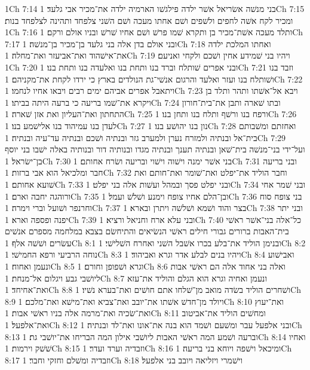 1Ch 7:14  בני מנשׁה אשׂריאל אשׁר ילדה פילגשׁו הארמיה ילדה את־מכיר אבי גלעד׃
1Ch 7:15  ומכיר לקח אשׁה לחפים ולשׁפים ושׁם אחתו מעכה ושׁם השׁני צלפחד ותהינה לצלפחד בנות׃
1Ch 7:16  ותלד מעכה אשׁת־מכיר בן ותקרא שׁמו פרשׁ ושׁם אחיו שׁרשׁ ובניו אולם ורקם׃
1Ch 7:17  ובני אולם בדן אלה בני גלעד בן־מכיר בן־מנשׁה׃
1Ch 7:18  ואחתו המלכת ילדה את־אישׁהוד ואת־אביעזר ואת־מחלה׃
1Ch 7:19  ויהיו בני שׁמידע אחין ושׁכם ולקחי ואניעם׃
1Ch 7:20  ובני אפרים שׁותלח וברד בנו ותחת בנו ואלעדה בנו ותחת בנו׃
1Ch 7:21  וזבד בנו ושׁותלח בנו ועזר ואלעד והרגום אנשׁי־גת הנולדים בארץ כי ירדו לקחת את־מקניהם׃
1Ch 7:22  ויתאבל אפרים אביהם ימים רבים ויבאו אחיו לנחמו׃
1Ch 7:23  ויבא אל־אשׁתו ותהר ותלד בן ויקרא את־שׁמו בריעה כי ברעה היתה בביתו׃
1Ch 7:24  ובתו שׁארה ותבן את־בית־חורון התחתון ואת־העליון ואת אזן שׁארה׃
1Ch 7:25  ורפח בנו ורשׁף ותלח בנו ותחן בנו׃
1Ch 7:26  לעדן בנו עמיהוד בנו אלישׁמע בנו׃
1Ch 7:27  נון בנו יהושׁע בנו׃
1Ch 7:28  ואחזתם ומשׁבותם בית־אל ובנתיה ולמזרח נערן ולמערב גזר ובנתיה ושׁכם ובנתיה עד־עיה ובנתיה׃
1Ch 7:29  ועל־ידי בני־מנשׁה בית־שׁאן ובנתיה תענך ובנתיה מגדו ובנותיה דור ובנותיה באלה ישׁבו בני יוסף בן־ישׂראל׃
1Ch 7:30  בני אשׁר ימנה וישׁוה וישׁוי ובריעה ושׂרח אחותם׃
1Ch 7:31  ובני בריעה חבר ומלכיאל הוא אבי ברזות׃
1Ch 7:32  וחבר הוליד את־יפלט ואת־שׁומר ואת־חותם ואת שׁועא אחותם׃
1Ch 7:33  ובני יפלט פסך ובמהל ועשׁות אלה בני יפלט׃
1Ch 7:34  ובני שׁמר אחי ורוהגה יחבה וארם׃
1Ch 7:35  ובן־הלם אחיו צופח וימנע ושׁלשׁ ועמל׃
1Ch 7:36  בני צופח סוח וחרנפר ושׁועל וברי וימרה׃
1Ch 7:37  בצר והוד ושׁמא ושׁלשׁה ויתרן ובארא׃
1Ch 7:38  ובני יתר יפנה ופספה וארא׃
1Ch 7:39  ובני עלא ארח וחניאל ורציא׃
1Ch 7:40  כל־אלה בני־אשׁר ראשׁי בית־האבות ברורים גבורי חילים ראשׁי הנשׂיאים והתיחשׂם בצבא במלחמה מספרם אנשׁים עשׂרים ושׁשׁה אלף׃
1Ch 8:1  ובנימן הוליד את־בלע בכרו אשׁבל השׁני ואחרח השׁלישׁי׃
1Ch 8:2  נוחה הרביעי ורפא החמישׁי׃
1Ch 8:3  ויהיו בנים לבלע אדר וגרא ואביהוד׃
1Ch 8:4  ואבישׁוע ונעמן ואחוח׃
1Ch 8:5  וגרא ושׁפופן וחורם׃
1Ch 8:6  ואלה בני אחוד אלה הם ראשׁי אבות ליושׁבי גבע ויגלום אל־מנחת׃
1Ch 8:7  ונעמן ואחיה וגרא הוא הגלם והוליד את־עזא ואת־אחיחד׃
1Ch 8:8  ושׁחרים הוליד בשׂדה מואב מן־שׁלחו אתם חושׁים ואת־בערא נשׁיו׃
1Ch 8:9  ויולד מן־חדשׁ אשׁתו את־יובב ואת־צביא ואת־מישׁא ואת־מלכם׃
1Ch 8:10  ואת־יעוץ ואת־שׂכיה ואת־מרמה אלה בניו ראשׁי אבות׃
1Ch 8:11  ומחשׁים הוליד את־אביטוב ואת־אלפעל׃
1Ch 8:12  ובני אלפעל עבר ומשׁעם ושׁמד הוא בנה את־אונו ואת־לד ובנתיה׃
1Ch 8:13  וברעה ושׁמע המה ראשׁי האבות ליושׁבי אילון המה הבריחו את־יושׁבי גת׃
1Ch 8:14  ואחיו שׁשׁק וירמות׃
1Ch 8:15  וזבדיה וערד ועדר׃
1Ch 8:16  ומיכאל וישׁפה ויוחא בני בריעה׃
1Ch 8:17  וזבדיה ומשׁלם וחזקי וחבר׃
1Ch 8:18  וישׁמרי ויזליאה ויובב בני אלפעל׃

